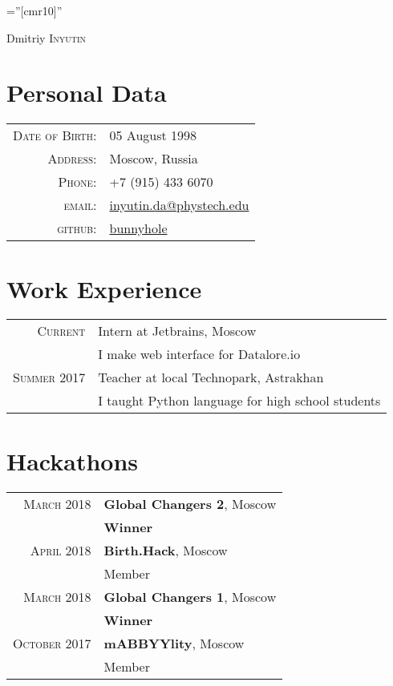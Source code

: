 \documentclass[a4paper,10pt]{article}
\begin{document}
\pagestyle{empty} 

\font\fb=''[cmr10]'' 


\par{\centering
		{\Huge Dmitriy \textsc{Inyutin}
	}\bigskip\par}


\section{Personal Data}

\begin{tabular}{rl}
    \textsc{Date of Birth:} & 05 August 1998 \\
    \textsc{Address:}   & Moscow, Russia \\
    \textsc{Phone:}     & +7 (915) 433 6070 \\
    \textsc{email:}     &  \href{mailto:alessandro.plasmati@gmail.com}{inyutin.da@phystech.edu} \\
    \textsc{github:}    &  \href{https://github.com/bunnyhole}{bunnyhole} \\
\end{tabular}

\section{Work Experience}
\begin{tabular}{r|p{11cm}}
    \textsc{Current} & Intern at Jetbrains, Moscow\\&\footnotesize{I make web interface for Datalore.io} \\
    \textsc{Summer 2017} & Teacher at local Technopark, Astrakhan\\&\footnotesize{I taught Python language for high school students} \\
\end{tabular}

\section{Hackathons}
\begin{tabular}{rl}
\textsc{March 2018}  &  \textbf{Global Changers 2}, Moscow\\
& \small\emph{}\textbf{Winner}\\
 \textsc{April 2018}  &  \textbf{Birth.Hack}, Moscow\\
& \small\emph{}Member\\
\textsc{March 2018}  &  \textbf{Global Changers 1}, Moscow\\
& \small\emph{}\textbf{Winner}\\
\textsc{October 2017}  & \textbf{mABBYYlity}, Moscow\\
& \small\emph{}Member\\
\end{tabular}
\end{document}
